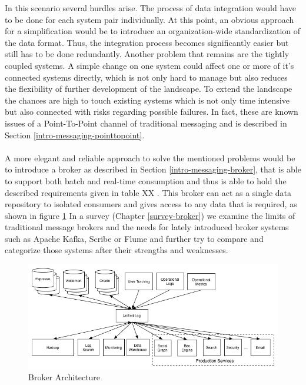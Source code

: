 In this scenario several hurdles arise. The process of data integration would
have to be done for each system pair individually. At this point, an obvious
approach for a simplification would be to introduce an organization-wide
standardization of the data format. Thus, the integration process becomes 
significantly easier but still has to be done redundantly. Another problem that
remains are the tightly coupled systems. A simple change on one system could
affect one or more of it's connected systems directly, which is not only hard to
manage but also reduces the flexibility of further development of the landscape.
To extend the landscape the chances are high to touch existing systems which is
not only time intensive but also connected with risks regarding possible failures. In fact,
these are known issues of a Point-To-Point channel of traditional messaging and
is described in Section \ref{intro-messaging-pointtopoint}.
\\ \\
A more elegant and reliable approach to solve the mentioned problems would be to
introduce a broker as described in Section \ref{intro-messaging-broker}, that is 
able to support both batch and real-time consumption and thus is able to hold
the described requirements given in table XX . 
This broker can act as a single data repository to isolated consumers and gives
access to any data that is required, as shown in figure
\ref{fig:datapipeline_simple} In a survey (Chapter \ref{survey-broker}) we examine the limits of
traditional message brokers and the needs for lately introduced broker systems
such as Apache Kafka\cite{apachekafka}, Scribe\cite{scribe} or
Flume\cite{apacheflume} and further try to compare and categorize those
systems after their strengths and weaknesses.

\begin{figure}[H]
    \centering
    \includegraphics[width=1.0\textwidth]{images/datapipeline_simple.png}
    \caption{Broker Architecture}
    \label{fig:datapipeline_simple}
\end{figure}


